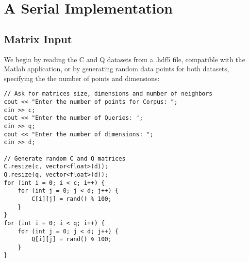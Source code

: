 \documentclass[12pt]{report}
\begin{document}
\chapter{A Serial Implementation}

\section{Matrix Input}
    We begin by reading the C and Q datasets from a .hdf5 file, compatible with the Matlab application, or by generating random data points for both datasets, specifying the the number of points and dimensions:
\begin{lstlisting}[style=cppstyle]
// Ask for matrices size, dimensions and number of neighbors
cout << "Enter the number of points for Corpus: ";
cin >> c;
cout << "Enter the number of Queries: ";
cin >> q;
cout << "Enter the number of dimensions: ";
cin >> d;
        
// Generate random C and Q matrices
C.resize(c, vector<float>(d));
Q.resize(q, vector<float>(d));
for (int i = 0; i < c; i++) {
    for (int j = 0; j < d; j++) {
        C[i][j] = rand() % 100;
    }
}
for (int i = 0; i < q; i++) {
    for (int j = 0; j < d; j++) {
        Q[i][j] = rand() % 100;
    }
}
\end{lstlisting}

\newpage
\end{document}

